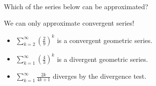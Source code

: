 \documentclass{ximera}
\begin{document}
\begin{question}
Which of the series below can be approximated? 

\begin{selectAll}
\end{selectAll}

\begin{feedback}
We can only approximate convergent series!

\begin{itemize}
\item $\sum_{k=2}^{\infty} \left(\frac{2}{9}\right)^k$ is a convergent geometric series.
\item $\sum_{k=1}^{\infty} \left(\frac{4}{3}\right)^k$ is a divergent geometric series.
\item $\sum_{k=1}^{\infty} \frac{2k}{4k+1}$ diverges by the divergence test.
\end{itemize}
\end{feedback}

\end{question}
\end{document}
